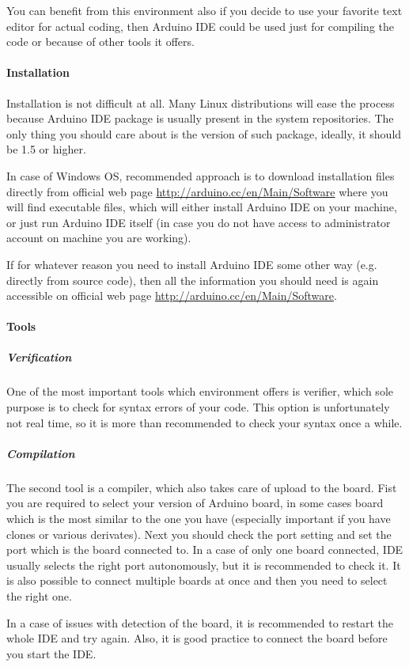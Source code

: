 \documentclass[12pt,titlepage]{article}
\begin{document}
    You can benefit from this environment also if you decide to use your favorite text editor for actual coding, then Arduino IDE could be used just for compiling the code or because of other tools it offers.
        \paragraph{Installation}
        Installation is not difficult at all. Many Linux distributions will ease the process because Arduino IDE package is usually present in the system repositories. The only thing you should care about is the version of such package, ideally, it should be 1.5 or higher.

        In case of Windows OS, recommended approach is to download installation files directly from official web page \url{http://arduino.cc/en/Main/Software} where you will find executable files, which will either install Arduino IDE on your machine, or just run Arduino IDE itself (in case you do not have access to administrator account on machine you are working).

        If for whatever reason you need to install Arduino IDE some other way (e.g. directly from source code), then all the information you should need is again accessible on official web page \url{http://arduino.cc/en/Main/Software}.
        \paragraph{Tools}
        \subparagraph{Verification}
        One of the most important tools which environment offers is verifier, which sole purpose is to  check for syntax errors of your code. This option is unfortunately not real time, so it is more than recommended to check your syntax once a while.
        \subparagraph{Compilation}
        The second tool is a compiler, which also takes care of upload to the board. Fist you are required to select your version of Arduino board, in some cases board which is the most similar to the one you have (especially important if you have clones or various derivates). Next you should check the port setting and set the port which is the board connected to. In a case of only one board connected, IDE usually selects the right port autonomously, but it is recommended to check it. It is also possible to connect multiple boards at once and then you need to select the right one.

        In a case of issues with detection of the board, it is recommended to restart the whole IDE and try again. Also, it is good practice to connect the board before you start the IDE.
\end{document}
